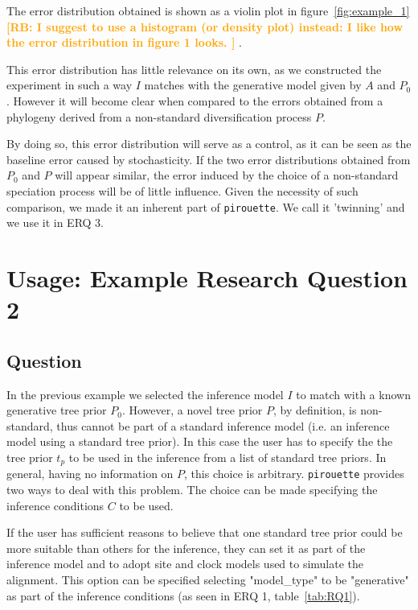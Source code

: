 \documentclass{article}
\newcommand{\richel}[1]{\textcolor{orange}{\textbf{[RB: #1]}}}
\begin{document}
The error distribution obtained is shown as a violin plot
in figure~\ref{fig:example_1}
\richel{
  I suggest to use a histogram (or density plot) instead:
  I like how the error distribution in figure 1 looks.
}
. 

This error distribution has little relevance on its own, 
as we constructed the experiment in such a way $\mathit{I}$ 
matches with the generative model given by $\mathit{A}$ and $\mathit{P_{0}}$.
However it will become clear when compared to the errors obtained from a 
phylogeny 
derived from a non-standard diversification process $\mathit{P}$.

By doing so, this error distribution will serve as a control,
as it can be seen as the baseline error caused by stochasticity.
If the two error distributions obtained from $\mathit{P_{0}}$ and $\mathit{P}$ 
will appear similar, the error induced by the choice of a non-standard 
speciation process will be of little influence.
Given the necessity of such comparison,
we made it an inherent part of \verb;pirouette;. 
We call it 'twinning' and we use it in ERQ 3.

\section{Usage: Example Research Question 2}

\subsection{Question}

In the previous example we selected the inference model $\mathit{I}$ to match 
with a known generative tree prior $\mathit{P_{0}}$.
However, a novel tree prior $\mathit{P}$, by definition, is non-standard, thus 
cannot be part of a standard inference model (i.e. an inference model using a 
standard tree prior).
In this case the user has to specify the the tree prior $\mathit{t_{p}}$ to be 
used in the inference from a list of standard tree priors. In general, having 
no information on $\mathit{P}$, this choice is arbitrary.
\verb;pirouette; provides two ways to deal with this problem. The choice can be 
made specifying the inference conditions $\mathit{C}$ to be used.

If the user has sufficient reasons to believe that one standard tree prior 
could be more suitable than others for the inference, they can set it as part 
of the inference model and to adopt site and clock models used to simulate the 
alignment. This option can be specified selecting "model\_type" to be 
"generative" as part of the inference conditions (as seen in ERQ 1, 
table~\ref{tab:RQ1}).
\end{document}
